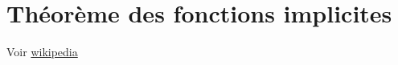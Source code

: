 \chapter{Théorème des fonctions implicites}

Voir
\href{http://fr.wikipedia.org/wiki/Th%C3%A9or%C3%A8me_des_fonctions_implicites}{wikipedia}
